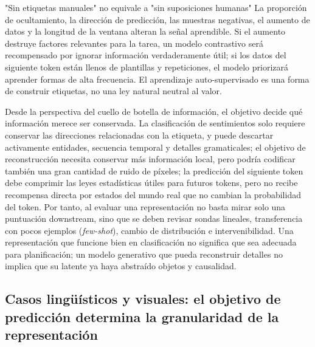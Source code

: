 

\begin{warningbox}{"Sin etiquetas manuales" no equivale a "sin suposiciones humanas"}
La proporción de ocultamiento, la dirección de predicción, las muestras negativas, el aumento de datos y la longitud de la ventana alteran la señal aprendible. Si el aumento destruye factores relevantes para la tarea, un modelo contrastivo será recompensado por ignorar información verdaderamente útil; si los datos del siguiente token están llenos de plantillas y repeticiones, el modelo priorizará aprender formas de alta frecuencia. El aprendizaje auto-supervisado es una forma de construir etiquetas, no una ley natural neutral al valor.
\end{warningbox}

Desde la perspectiva del cuello de botella de información, el objetivo decide qué información merece ser conservada. La clasificación de sentimientos solo requiere conservar las direcciones relacionadas con la etiqueta, y puede descartar activamente entidades, secuencia temporal y detalles gramaticales; el objetivo de reconstrucción necesita conservar más información local, pero podría codificar también una gran cantidad de ruido de píxeles; la predicción del siguiente token debe comprimir las leyes estadísticas útiles para futuros tokens, pero no recibe recompensa directa por estados del mundo real que no cambian la probabilidad del token. Por tanto, al evaluar una representación no basta mirar solo una puntuación downstream, sino que se deben revisar sondas lineales, transferencia con pocos ejemplos (\textit{few-shot}), cambio de distribución e intervenibilidad. Una representación que funcione bien en clasificación no significa que sea adecuada para planificación; un modelo generativo que pueda reconstruir detalles no implica que su latente ya haya abstraído objetos y causalidad.

\subsection{Casos lingüísticos y visuales: el objetivo de predicción determina la granularidad de la representación}

